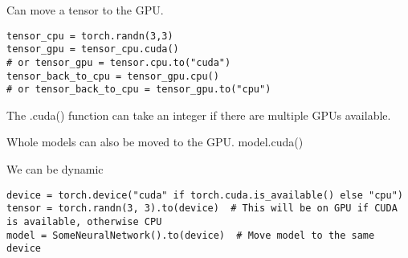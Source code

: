 Can move a tensor to the GPU.

\begin{verbatim}
tensor_cpu = torch.randn(3,3)
tensor_gpu = tensor_cpu.cuda()
# or tensor_gpu = tensor.cpu.to("cuda")
tensor_back_to_cpu = tensor_gpu.cpu()
# or tensor_back_to_cpu = tensor_gpu.to("cpu")
\end{verbatim}

The .cuda() function can take an integer if there are multiple GPUs available.

Whole models can also be moved to the GPU.
model.cuda()

We can be dynamic
\begin{verbatim}
device = torch.device("cuda" if torch.cuda.is_available() else "cpu")
tensor = torch.randn(3, 3).to(device)  # This will be on GPU if CUDA is available, otherwise CPU
model = SomeNeuralNetwork().to(device)  # Move model to the same device
\end{verbatim}

